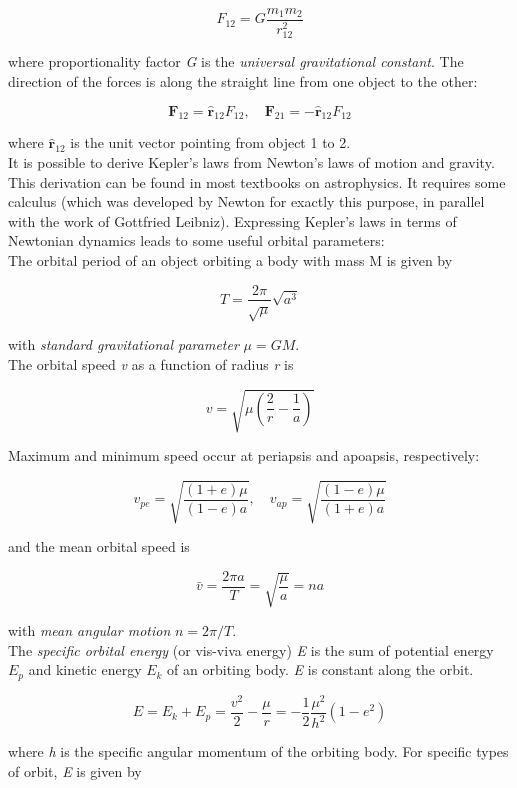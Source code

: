 \documentclass[Orbiter User Manual.tex]{subfiles}
\begin{document}
\[ F_{12} = G \frac{m_{1}m_{2}}{r_{12}^{2}} \]

\noindent
where proportionality factor \textit{G} is the \textit{universal gravitational constant}. The direction of the forces is along the straight line from one object to the other:

\[ \textbf{F}_{12} = \hat{\textbf{r}}_{12} F_{12}, \quad \textbf{F}_{21} = - \hat{\textbf{r}}_{12} F_{12} \]

\noindent
where $\hat{\textbf{r}}_{12}$ is the unit vector pointing from object 1 to 2.\\
It is possible to derive Kepler's laws from Newton's laws of motion and gravity. This derivation can be found in most textbooks on astrophysics. It requires some calculus (which was developed by Newton for exactly this purpose, in parallel with the work of Gottfried Leibniz). Expressing Kepler's laws in terms of Newtonian dynamics leads to some useful orbital parameters:\\
The orbital period of an object orbiting a body with mass M is given by

\[ T = \frac{2 \pi}{\sqrt{\mu}} \sqrt{a^{3}} \]

\noindent
with \textit{standard gravitational parameter} $\mu = GM$.\\
The orbital speed \textit{v} as a function of radius \textit{r} is

\[ v = \sqrt{\mu \left(\frac{2}{r} - \frac{1}{a}\right)} \]

\noindent
Maximum and minimum speed occur at periapsis and apoapsis, respectively:

\[ v_{pe} = \sqrt{\frac{(1 + e) \mu}{(1 - e) a}}, \quad v_{ap} = \sqrt{\frac{(1 - e) \mu}{(1 + e) a}} \]

\noindent
and the mean orbital speed is

\[ \bar{v} = \frac{2 \pi a}{T} = \sqrt{\frac{\mu}{a}} = n a \]

\noindent
with \textit{mean angular motion} $n = 2 \pi / T$.\\
The \textit{specific orbital energy} (or vis-viva energy) \textit{E} is the sum of potential energy $E_{p}$ and kinetic energy $E_{k}$ of an orbiting body. \textit{E} is constant along the orbit.

\[ E = E_{k} + E_{p} = \frac{v^{2}}{2} - \frac{\mu}{r} = - \frac{1}{2} \frac{\mu^{2}}{h^{2}}(1 - e^{2}) \]

\noindent
where \textit{h} is the specific angular momentum of the orbiting body. For specific types of orbit, \textit{E} is given by
\end{document}
